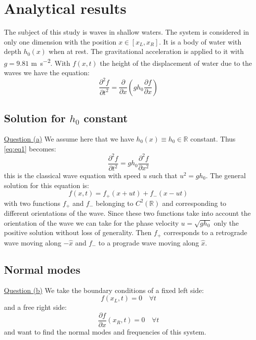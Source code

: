 \section{Analytical results}
The subject of this study is waves in shallow waters. The system is considered in only one dimension with the position $x \in [x_L, x_R]$. It is a body of water with depth $h_0(x)$ when at rest. The gravitational acceleration is applied to it with $g = 9.81$ \si{\meter\per\square\second}. With $f(x,t)$ the height of the displacement of water due to the waves we have the equation:
\begin{equation}
    \frac{\partial^2 f}{\partial t^2} = \frac{\partial}{\partial x} \left( g h_0 \frac{\partial f}{\partial x} \right)
    \label{eq:eq1}
\end{equation}

\subsection{Solution for $h_0$ constant}
\underline{Question (a)}
We assume here that we have $h_0(x) \equiv h_0 \in \mathbb{R}$ constant. Thus \autoref{eq:eq1} becomes:
\begin{equation}
    \frac{\partial^2 f}{\partial t^2} = g h_0 \frac{\partial^2 f}{\partial x^2}
    \label{eq:eq_h0_const}
\end{equation}
this is the classical wave equation with speed $u$ such that $u^2 = gh_0$. The general solution for this equation is:
\begin{equation}
    f(x,t) = f_+(x+ut) + f_-(x-ut)
    \label{eq:general_solution}
\end{equation}
with two functions $f_+$ and $f_-$ belonging to $C^2(\mathbb{R})$ and corresponding to different orientations of the wave. Since these two functions take into account the orientation of the wave we can take for the phase velocity $u = \sqrt{gh_0}$ only the positive solution without loss of generality. Then $f_+$ corresponds to a retrograde wave moving along $-\hat{x}$ and $f_-$ to a prograde wave moving along $\hat{x}$.

\subsection{Normal modes}
\underline{Question (b)}
We take the boundary conditions of a fixed left side:
\begin{equation}
    f(x_L, t) = 0 \quad \forall t
    \label{eq:condition_left}
\end{equation}
and a free right side:
\begin{equation}
    \frac{\partial f}{\partial x}(x_R,t) = 0 \quad \forall t
    \label{eq:condition_right}
\end{equation}
and want to find the normal modes and frequencies of this system.

